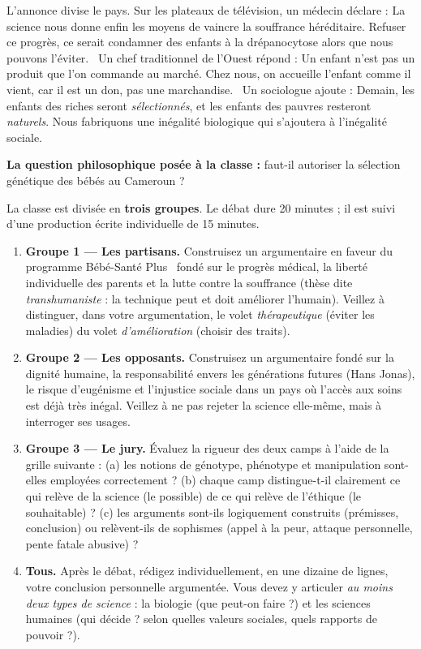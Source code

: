 \documentclass[11pt]{article}
\newcounter{popsec}
\newcounter{popsub}
\newcommand{\courssub}[1]{%
  \stepcounter{popsub}%
  \par\vspace{9pt}\noindent{\popxbold\fontsize{11.5}{13}\selectfont\color{popink}{\color{poporange}\thepopsec.\thepopsub}\hspace{6pt}#1}\par\nopagebreak\vspace{4pt}
}
\begin{document}
L'annonce divise le pays. Sur les plateaux de télévision, un médecin déclare : \guillemotleft La science nous donne enfin les moyens de vaincre la souffrance héréditaire. Refuser ce progrès, ce serait condamner des enfants à la drépanocytose alors que nous pouvons l'éviter. \guillemotright\ Un chef traditionnel de l'Ouest répond : \guillemotleft Un enfant n'est pas un produit que l'on commande au marché. Chez nous, on accueille l'enfant comme il vient, car il est un don, pas une marchandise. \guillemotright\ Un sociologue ajoute : \guillemotleft Demain, les enfants des riches seront \emph{sélectionnés}, et les enfants des pauvres resteront \emph{naturels}. Nous fabriquons une inégalité biologique qui s'ajoutera à l'inégalité sociale. \guillemotright

\textbf{La question philosophique posée à la classe :} faut-il autoriser la sélection génétique des bébés au Cameroun ?

\courssub{Consignes}

La classe est divisée en \textbf{trois groupes}. Le débat dure 20 minutes ; il est suivi d'une production écrite individuelle de 15 minutes.

\begin{enumerate}
\item \textbf{Groupe 1 — Les partisans.} Construisez un argumentaire en faveur du programme \guillemotleft Bébé-Santé Plus \guillemotright\ fondé sur le progrès médical, la liberté individuelle des parents et la lutte contre la souffrance (thèse dite \emph{transhumaniste} : la technique peut et doit améliorer l'humain). Veillez à distinguer, dans votre argumentation, le volet \emph{thérapeutique} (éviter les maladies) du volet \emph{d'amélioration} (choisir des traits).
\item \textbf{Groupe 2 — Les opposants.} Construisez un argumentaire fondé sur la dignité humaine, la responsabilité envers les générations futures (Hans Jonas), le risque d'eugénisme et l'injustice sociale dans un pays où l'accès aux soins est déjà très inégal. Veillez à ne pas rejeter la science elle-même, mais à interroger ses usages.
\item \textbf{Groupe 3 — Le jury.} Évaluez la rigueur des deux camps à l'aide de la grille suivante : (a) les notions de génotype, phénotype et manipulation sont-elles employées correctement ? (b) chaque camp distingue-t-il clairement ce qui relève de la science (le possible) de ce qui relève de l'éthique (le souhaitable) ? (c) les arguments sont-ils logiquement construits (prémisses, conclusion) ou relèvent-ils de sophismes (appel à la peur, attaque personnelle, pente fatale abusive) ?
\item \textbf{Tous.} Après le débat, rédigez individuellement, en une dizaine de lignes, votre conclusion personnelle argumentée. Vous devez y articuler \emph{au moins deux types de science} : la biologie (que peut-on faire ?) et les sciences humaines (qui décide ? selon quelles valeurs sociales, quels rapports de pouvoir ?).
\end{enumerate}
\end{document}
